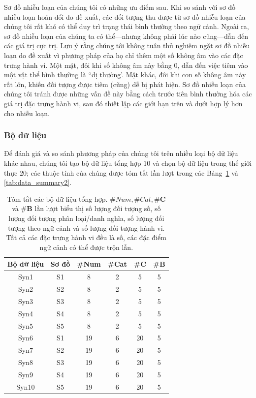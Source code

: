 Sơ đồ nhiễu loạn của chúng tôi có những ưu điểm sau. Khi so sánh với sơ đồ nhiễu loạn hoán đổi do \cite{song2007conditional} đề xuất, các đối tượng thu được từ sơ đồ nhiễu loạn của chúng tôi rất khó có thể duy trì trạng thái bình thường theo ngữ cảnh. Ngoài ra, sơ đồ nhiễu loạn của chúng ta có thể---nhưng không phải lúc nào cũng---dẫn đến các giá trị cực trị. Lưu ý rằng chúng tôi không tuân thủ nghiêm ngặt sơ đồ nhiễu loạn do \cite{kuo2018detecting} đề xuất vì phương pháp của họ chỉ thêm một số không âm vào các đặc trưng hành vi. Một mặt, đôi khi số không âm này bằng 0, dẫn đến việc tiêm vào một vật thể bình thường là ``dị thường'. Mặt khác, đôi khi con số không âm này rất lớn, khiến đối tượng được tiêm (cũng) dễ bị phát hiện. Sơ đồ nhiễu loạn của chúng tôi tránh được những vấn đề này bằng cách trước tiên bình thường hóa các giá trị đặc trưng hành vi, sau đó thiết lập các giới hạn trên và dưới hợp lý hơn cho nhiễu loạn.

\subsubsection{Bộ dữ liệu}

Để đánh giá và so sánh phương pháp của chúng tôi trên nhiều loại bộ dữ liệu khác nhau, chúng tôi tạo bộ dữ liệu tổng hợp $10$ và chọn bộ dữ liệu trong thế giới thực $20$; các thuộc tính của chúng được tóm tắt lần lượt trong các Bảng~\ref{tab:data_summary1} và \ref{tab:data_summary2}.\begin{table}[!htbp]
	\caption{Tóm tắt các bộ dữ liệu tổng hợp. $\#Num, \#Cat, \#\mathbf{C}$ và $\#\mathbf{B}$ lần lượt biểu thị số lượng đối tượng số, số lượng đối tượng phân loại/danh nghĩa, số lượng đối tượng theo ngữ cảnh và số lượng đối tượng hành vi. Tất cả các đặc trưng hành vi đều là số, các đặc điểm ngữ cảnh có thể được trộn lẫn.}
	\centering
	\begin{tabular}{cccccc}
		\toprule
		Bộ dữ liệu &Sơ đồ & \#Num & \#Cat & \#$\mathbf{C}$ & \#$\mathbf{B}$ \\
		\midrule
		Syn1 & S1 & 8 & 2 & 5 & 5 \\
		\midrule
		Syn2 & S2 & 8 & 2 & 5 & 5 \\
		\midrule
		Syn3 & S3 & 8 & 2 & 5 & 5 \\
		\midrule
		Syn4 & S4 & 8 & 2 & 5 & 5 \\
		\midrule
		Syn5 & S5 & 8 & 2 & 5 & 5 \\
		\midrule
		Syn6 & S1 & 19 & 6 & 20 & 5 \\
		\midrule
		Syn7 & S2 & 19 & 6 & 20 & 5 \\
		\midrule
		Syn8 & S3 & 19 & 6 & 20 & 5 \\
		\midrule
		Syn9 & S4 & 19 & 6 & 20 & 5 \\
		\midrule
		Syn10 & S5 & 19 & 6 & 20 & 5 \\
		\bottomrule
	\end{tabular}
	\label{tab:data_summary1}
\end{table}

